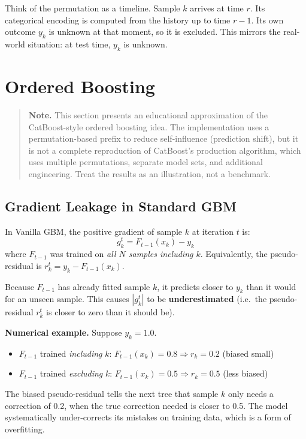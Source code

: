 \documentclass[11pt, a4paper]{article}
\begin{document}
Think of the permutation as a timeline. Sample $k$ arrives at time $r$.
Its categorical encoding is computed from the history up to time $r-1$.
Its own outcome $y_k$ is unknown at that moment, so it is excluded.
This mirrors the real-world situation: at test time, $y_k$ is unknown.

\section{Ordered Boosting}
\label{sec:ordered_boosting}

\begin{quote}\small
\textbf{Note.} This section presents an educational approximation of the
CatBoost-style ordered boosting idea. The implementation uses a
permutation-based prefix to reduce self-influence (prediction shift),
but it is not a complete reproduction of CatBoost's production algorithm,
which uses multiple permutations, separate model sets, and additional
engineering. Treat the results as an illustration, not a benchmark.
\end{quote}

\subsection{Gradient Leakage in Standard GBM}

In Vanilla GBM, the positive gradient of sample $k$ at iteration $t$ is:
\[
g_k^t = F_{t-1}(x_k) - y_k
\]
where $F_{t-1}$ was trained on \emph{all $N$ samples including $k$}.
Equivalently, the pseudo-residual is $r_k^t = y_k - F_{t-1}(x_k)$.

Because $F_{t-1}$ has already fitted sample $k$, it predicts closer
to $y_k$ than it would for an unseen sample. This causes $|g_k^t|$
to be \textbf{underestimated} (i.e.\ the pseudo-residual $r_k^t$ is
closer to zero than it should be).

\textbf{Numerical example.} Suppose $y_k = 1.0$.
\begin{itemize}
  \item $F_{t-1}$ trained \emph{including} $k$:
    $F_{t-1}(x_k) = 0.8 \Rightarrow r_k = 0.2$ \quad (biased small)
  \item $F_{t-1}$ trained \emph{excluding} $k$:
    $F_{t-1}(x_k) = 0.5 \Rightarrow r_k = 0.5$ \quad (less biased)
\end{itemize}
The biased pseudo-residual tells the next tree that sample $k$ only needs
a correction of 0.2, when the true correction needed is closer to 0.5.
The model systematically under-corrects its mistakes on training data,
which is a form of overfitting.
\end{document}
